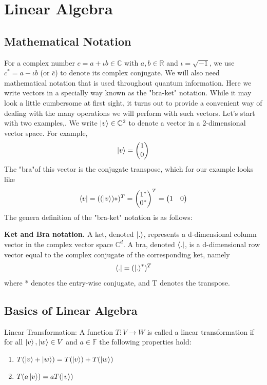 \section{Linear Algebra}
\subsection{Mathematical Notation}
For a complex number $c=a+\iota b \in \mathbb{C}$ with $a,b\in \mathbb{R}$ and $\iota =\sqrt{-1}$, we use $c^*=a-\iota b$ (or $\overline{c}$) to denote its complex conjugate. We will also need mathematical notation that is used throughout quantum information. Here we write vectors in a specially way known as the "bra-ket" notation. While it may look a little cumbersome at first sight, it turns out to provide a convenient way of dealing with the many operations we will perform with such vectors. Let's start with two examples,. We write $\ket{v} \in \mathbb{C}^2$ to denote a vector in a 2-dimensional vector space. For example,
\[
\ket{v}=\begin{pmatrix} 1 \\ 0 \end{pmatrix}
\]
The "bra"of this vector is the conjugate transpose, which for our example looks like
\[
\bra{v} = ((\ket{v})*)^T=\begin{pmatrix} 1^* \\ 0^* \end{pmatrix}^T=\begin{pmatrix} 1 & 0 \end{pmatrix}
\]
The genera definition of the "bra-ket" notation is as follows:
\begin{definition}
    \textbf{Ket and Bra notation.} A ket, denoted $\ket{.}$, represents a d-dimensional column vector in the complex vector space $\mathbb{C}^d$. A bra, denoted $\bra{.}$, is a d-dimensional row vector equal to the complex conjugate of the corresponding ket, namely
    \[
    \bra{.}=(\ket{.}^*)^T
    \]
    where * denotes the entry-wise conjugate, and T denotes the transpose.
\end{definition}


\subsection{Basics of Linear Algebra}

\begin{definition}
    Linear Transformation: A function $T:V\rightarrow W$ is called a linear transformation if for all $\ket{v},\ket{w}\in V$ and $a\in\mathbb{F}$ the following properties hold:
    \begin{enumerate}
        \item $T(\ket{v}+\ket{w})=T(\ket{v})+T(\ket{w})$
        \item $T(a\ket{v})=aT(\ket{v})$
    \end{enumerate}
\end{definition}


